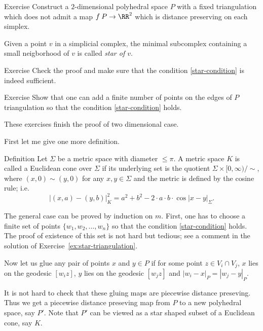 \begin{thm}{Exercise}\label{ex:PDP+fixed-triang}
Construct a $2$-dimensional polyhedral space $P$ 
with a fixed triangulation which does not admit 
a map $f\:P\to\RR^2$ which is distance preserving on each simplex.
\end{thm}





Given a point $v$ in a simplicial complex,
the minimal subcomplex containing a small neigborhood of $v$ is called \emph{star of $v$}.



\begin{thm}{Exercise}
Check the proof and make sure that the condition \ref{star-condition} is indeed sufficient.
\end{thm}


\begin{thm}{Exercise}\label{ex:star-triangulation}
Show that one can add a finite number of points on the edges of $P$ triangulation so that the condition \ref{star-condition} holds.
\end{thm}

These exercises finish the proof of two dimensional case.

First let me give one more definition.

\begin{thm}{Definition}
 Let $\Sigma$ be a metric space with diameter $\le \pi$. 
A metric space $K$ is called a Euclidean cone over $\Sigma$
if its underlying set 
is the quotient $\Sigma\times [0,\infty)/{\sim}$, 
where $(x,0)\sim(y,0)$ for any $x,y\in \Sigma$
and the metric is defined by the cosine rule;
i.e. 
$$|(x,a)-(y,b)|^2_K=a^2+b^2-2\cdot a\cdot b\cdot\cos|x-y|_\Sigma.$$

\end{thm}

The general case can be proved by induction on $m$. 
First, one has to choose a finite set of points $\{w_1,w_2,\dots,w_n\}$
so that the condition \ref{star-condition} holds.
The proof of existence of this set is not hard but tedious;
see a comment in the solution of Exercise~\ref{ex:star-triangulation}.

Now let us glue any pair of points $x$ and $y\in P$
if for some point $z\in V_i\cap V_j$, 
$x$ lies on the geodesic $[w_iz]$,
$y$ lies on the geodesic $[w_jz]$
and $|w_i-x|_P=|w_j-y|_P$.

It is not hard to check that these gluing maps are piecewise distance preseving.
Thus we get a piecewise distance preseving map from $P$ to a new  polyhedral space,
say $P'$.
Note that $P'$ can be viewed as a star shaped subset of a Euclidean cone,
 say $K$.

